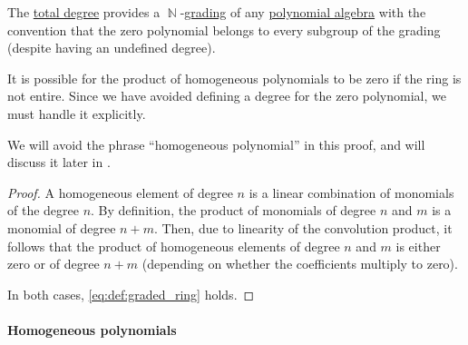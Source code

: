 \begin{proposition}\label{thm:polynomial_algebra_grading}
  The \hyperref[def:polynomial_degree]{total degree} provides a \( \BbbN \)-\hyperref[def:graded_ring]{grading} of any \hyperref[def:polynomial_algebra]{polynomial algebra} with the convention that the zero polynomial belongs to every subgroup of the grading (despite having an undefined degree).
\end{proposition}
\begin{comments}
  \item It is possible for the product of homogeneous polynomials to be zero if the ring is not entire. Since we have avoided defining a degree for the zero polynomial, we must handle it explicitly.

  \item We will avoid the phrase \enquote{homogeneous polynomial} in this proof, and will discuss it later in .
\end{comments}
\begin{proof}
  A homogeneous element of degree \( n \) is a linear combination of monomials of the degree \( n \). By definition, the product of monomials of degree \( n \) and \( m \) is a monomial of degree \( n + m \). Then, due to linearity of the convolution product, it follows that the product of homogeneous elements of degree \( n \) and \( m \) is either zero or of degree \( n + m \) (depending on whether the coefficients multiply to zero).

  In both cases, \eqref{eq:def:graded_ring} holds.
\end{proof}

\paragraph{Homogeneous polynomials}

